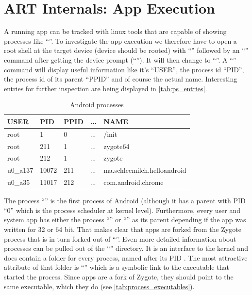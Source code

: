 \chapter{ART Internals: App Execution}
\label{chapter:art_internals_app_execution}

A running app can be tracked with linux tools that are capable
of showing processes like ``''. To investigate the app execution
we therefore have to open a root shell at the target device
(device should be rooted) with ``''
followed by an ``'' command after getting the
device prompt (``''). It will then change
to ``''. A ``'' command will display
useful information like it's ``USER'', the process id ``PID'',
the process id of its parent ``PPID'' and of course the actual name.
Interesting entries for further inspection are being displayed in
\autoref{tab:ps_entries}.

\begin{table}[htb]
  \caption[Android processes]{Android processes}
  \label{tab:ps_entries}
  \centering
  \begin{tabular}{l l l l l}
    \toprule
      USER & PID & PPID & ... & NAME \\
    \midrule
      root & 1 & 0 & ... & /init \\
      root & 211 & 1 & ... & zygote64 \\
      root & 212 & 1 & ... & zygote \\
      u0\_a137 & 10072 & 211 & ... & ma.schleemilch.helloandroid \\
      u0\_a35 & 11017 & 212 & ... & com.android.chrome \\
    \bottomrule
  \end{tabular}
\end{table}

The process ``'' is the first process of Android (although
it has a parent with PID ``0'' which is the process scheduler at kernel
level).
Furthermore, every user and system app has either the process
``'' or ``'' as its parent depending
if the app was written for 32 or 64 bit. That makes clear that apps
are forked from the Zygote process that is in turn forked out of
``''. Even more detailed information about processes can be
pulled out of the ``'' directory. It is an interface to the
kernel and does contain a folder for every process, named after its PID
\parencite{proc}. The most attractive attribute of that folder is
``'' which is a symbolic link to the executable that started
the process. Since apps are a fork of Zygote, they should point
to the same executable, which they do (see \autoref{tab:process_executables}).

